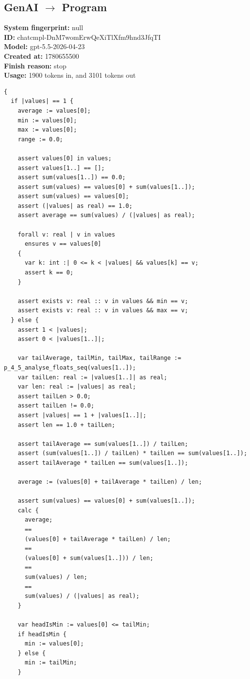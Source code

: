 \documentclass{article}
\begin{document}
\subsection*{GenAI $\rightarrow$ Program}
\textbf{System fingerprint: }null
\\\textbf{ID: }chatcmpl-DnM7womErwQeXiTlXfm9hnd3JfqTI
\\\textbf{Model: }gpt-5.5-2026-04-23
\\\textbf{Created at: }1780655500
\\\textbf{Finish reason: }stop
\\\textbf{Usage: }1900 tokens in, and 3101 tokens out
\begin{lstlisting}
{
  if |values| == 1 {
    average := values[0];
    min := values[0];
    max := values[0];
    range := 0.0;

    assert values[0] in values;
    assert values[1..] == [];
    assert sum(values[1..]) == 0.0;
    assert sum(values) == values[0] + sum(values[1..]);
    assert sum(values) == values[0];
    assert (|values| as real) == 1.0;
    assert average == sum(values) / (|values| as real);

    forall v: real | v in values
      ensures v == values[0]
    {
      var k: int :| 0 <= k < |values| && values[k] == v;
      assert k == 0;
    }

    assert exists v: real :: v in values && min == v;
    assert exists v: real :: v in values && max == v;
  } else {
    assert 1 < |values|;
    assert 0 < |values[1..]|;

    var tailAverage, tailMin, tailMax, tailRange := p_4_5_analyse_floats_seq(values[1..]);
    var tailLen: real := |values[1..]| as real;
    var len: real := |values| as real;
    assert tailLen > 0.0;
    assert tailLen != 0.0;
    assert |values| == 1 + |values[1..]|;
    assert len == 1.0 + tailLen;

    assert tailAverage == sum(values[1..]) / tailLen;
    assert (sum(values[1..]) / tailLen) * tailLen == sum(values[1..]);
    assert tailAverage * tailLen == sum(values[1..]);

    average := (values[0] + tailAverage * tailLen) / len;

    assert sum(values) == values[0] + sum(values[1..]);
    calc {
      average;
      ==
      (values[0] + tailAverage * tailLen) / len;
      ==
      (values[0] + sum(values[1..])) / len;
      ==
      sum(values) / len;
      ==
      sum(values) / (|values| as real);
    }

    var headIsMin := values[0] <= tailMin;
    if headIsMin {
      min := values[0];
    } else {
      min := tailMin;
    }


\end{lstlisting}
\end{document}
